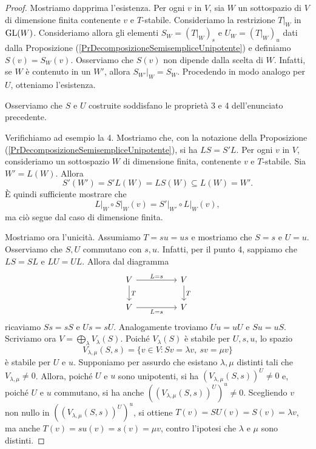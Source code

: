 \begin{proof}
    Mostriamo dapprima l'esistenza. Per ogni $v$ in $V$, sia $W$ un sottospazio di $V$ di dimensione finita contenente $v$ e $T$-stabile. Consideriamo la restrizione $\left.T\right|_W$ in $\mathrm{GL}(W)$. Consideriamo allora gli elementi $S_W=(\left.T\right|_W)_s$ e $U_W=(\left.T\right|_W)_u$ dati dalla Proposizione (\ref{PrDecomposizioneSemisempliceUnipotente}) e definiamo $S(v)=S_W(v)$. Osserviamo che $S(v)$ non dipende dalla scelta di $W$. Infatti, se $W$ è contenuto in un $W'$, allora $\left.S_{W'}\right|_{W}=S_W$. Procedendo in modo analogo per $U$, otteniamo l'esistenza. 

    Osserviamo che $S$ e $U$ costruite soddisfano le proprietà 3 e 4 dell'enunciato precedente. \begin{mdframed}[topline=false,rightline=false,bottomline=false]  Verifichiamo ad esempio la 4. Mostriamo che, con la notazione della Proposizione (\ref{PrDecomposizioneSemisempliceUnipotente}), si ha $LS=S'L$. Per ogni $v$ in $V$, consideriamo un sottospazio $W$ di dimensione finita, contenente $v$ e $T$-stabile. Sia $W'=L(W)$. Allora \[S'(W')=S'L(W)=LS(W)\subseteq L(W)=W'.\]
    È quindi sufficiente mostrare che \[\left.L\right|_{W}\circ \left.S\right|_{W} (v)=\left.S'\right|_{W'}\circ \left.L\right|_{W} (v),\] ma ciò segue dal caso di dimensione finita.
    \end{mdframed}
Mostriamo ora l'unicità. Assumiamo $T=su=us$ e mostriamo che $S=s$ e $U=u$. Osserviamo che $S,U$ commutano con $s,u$. Infatti, per il punto 4, sappiamo che $LS=SL$ e $LU=UL$. Allora dal diagramma %
\[\begin{tikzcd}
	V && V \\
	V && V
	\arrow["{L=s}", from=1-1, to=1-3]
	\arrow["T", from=1-1, to=2-1]
	\arrow["T", from=1-3, to=2-3]
	\arrow["{L=s}"', from=2-1, to=2-3]
\end{tikzcd}\]
ricaviamo $Ss=sS$ e $Us=sU$. Analogamente troviamo $Uu=uU$ e $Su=uS$. Scriviamo ora $V=\bigoplus_\lambda V_\lambda(S)$. Poiché $V_\lambda(S)$ è stabile per $U,s,u$, lo spazio \[V_{\lambda,\mu}(S,s)=\{v\in V\colon Sv=\lambda v, \ sv=\mu v\}\] è stabile per $U$ e $u$. Supponiamo per assurdo che esistano $\lambda, \mu$ distinti tali che $V_{\lambda,\mu}\ne 0$. Allora, poiché $U$ e $u$ sono unipotenti, si ha $(V_{\lambda,\mu}(S,s))^U\ne 0$ e, poiché $U$ e $u$ commutano, si ha anche $((V_{\lambda,\mu}(S,s))^U)^u\ne 0$. Scegliendo $v$ non nullo in $((V_{\lambda,\mu}(S,s))^U)^u$, si ottiene $T(v)=SU(v)=S(v)=\lambda v$, ma anche $T(v)=su(v)=s(v)=\mu v$, contro l'ipotesi che $\lambda$ e $\mu$ sono distinti.
\end{proof}

